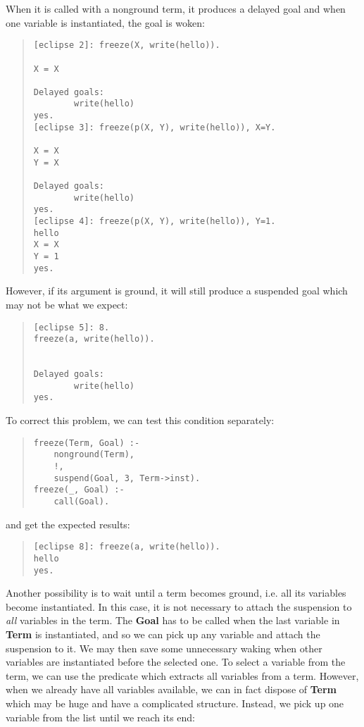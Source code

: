 When it is called with a nonground term, it produces a delayed goal
and when one variable is instantiated, the goal is woken:

\begin{quote}
\begin{verbatim}
[eclipse 2]: freeze(X, write(hello)).

X = X

Delayed goals:
        write(hello)
yes.
[eclipse 3]: freeze(p(X, Y), write(hello)), X=Y.

X = X
Y = X

Delayed goals:
        write(hello)
yes.
[eclipse 4]: freeze(p(X, Y), write(hello)), Y=1.
hello
X = X
Y = 1
yes.
\end{verbatim}
\end{quote}

However, if its argument is ground, it will still produce
a suspended goal which may not be what we expect:
\begin{quote}
\begin{verbatim}
[eclipse 5]: 8.
freeze(a, write(hello)).


Delayed goals:
        write(hello)
yes.
\end{verbatim}
\end{quote}
To correct this problem, we can test this condition separately:
\begin{quote}
\begin{verbatim}
freeze(Term, Goal) :-
    nonground(Term),
    !,
    suspend(Goal, 3, Term->inst).
freeze(_, Goal) :-
    call(Goal).
\end{verbatim}
\end{quote}

and get the expected results:
\begin{quote}
\begin{verbatim}
[eclipse 8]: freeze(a, write(hello)).
hello
yes.
\end{verbatim}
\end{quote}

Another possibility is to wait until a term becomes ground,
i.e. all its variables become instantiated.
In this case, it is not necessary to attach the suspension
to {\it all} variables in the term.
The {\bf Goal} has to be called when the last variable in {\bf Term}
is instantiated, and so we can pick up any variable and
attach the suspension to it.
We may then save some unnecessary waking when other variables
are instantiated before the selected one.
To select a variable from the term,
we can use the predicate  which extracts
all variables from a term.
However, when we already have all variables available, we can in fact
dispose of {\bf Term} which may be huge and have
a complicated structure.
Instead, we pick up one variable from the list until
we reach its end:

